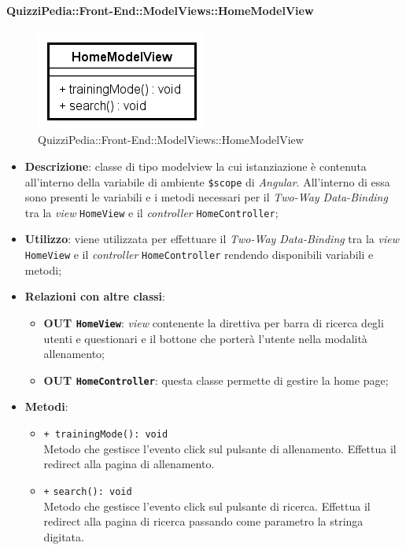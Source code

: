 \paragraph{QuizziPedia::Front-End::ModelViews::HomeModelView}
	
	\label{QuizziPedia::Front-End::ModelViews::HomeModelView}
	
	\begin{figure}[ht]
		\centering
		\includegraphics[scale=0.80,keepaspectratio]{UML/Classi/Front-End/QuizziPedia_Front-end_ModelView_HomeModelView.png}
		\caption{QuizziPedia::Front-End::ModelViews::HomeModelView}
	\end{figure} \FloatBarrier
	
	\begin{itemize}
		\item \textbf{Descrizione}: classe di tipo modelview la cui istanziazione è contenuta all'interno della variabile di ambiente \texttt{\$scope} di \textit{Angular}. All'interno di essa sono presenti le variabili e i metodi necessari per il \textit{Two-Way Data-Binding} tra la \textit{view} \texttt{HomeView} e il \textit{controller} \texttt{HomeController};
		\item \textbf{Utilizzo}: viene utilizzata per effettuare il \textit{Two-Way Data-Binding} tra la \textit{view} \texttt{HomeView} e il \textit{controller} \texttt{HomeController} rendendo disponibili variabili e metodi;
		\item \textbf{Relazioni con altre classi}: 
		\begin{itemize}
			\item \textbf{OUT \texttt{HomeView}}: \textit{view} contenente la direttiva per barra di ricerca degli utenti e questionari e il bottone che porterà l'utente nella modalità allenamento; 
			\item \textbf{OUT \texttt{HomeController}}: questa classe permette di gestire la home page;
		\end{itemize}
		\item \textbf{Metodi}: 
		\begin{itemize}
			\item \texttt{+ trainingMode(): void} \\
			Metodo che gestisce l’evento click sul pulsante di allenamento. Effettua il redirect alla pagina di allenamento.
			\item \texttt{+} \texttt{search(): void} \\
			Metodo che gestisce l’evento click sul pulsante di ricerca. Effettua il redirect alla pagina di ricerca passando come parametro la stringa digitata.
		\end{itemize}
	\end{itemize}
	
	